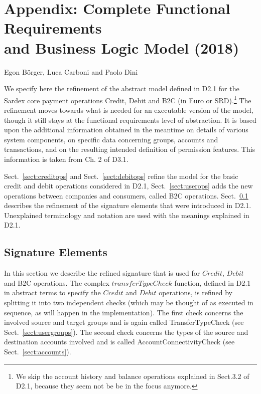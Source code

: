 \chapter*{Appendix: Complete Functional Requirements\\ and Business Logic Model (2018)}
\label{appendix}

\vspace{-1cm}
\begin{center}
Egon B\"orger, Luca Carboni and Paolo Dini
\end{center}

We specify here the refinement of the abstract model defined in D2.1 for the Sardex core payment operations Credit, Debit and B2C (in Euro or SRD).\footnote{We skip the account history and balance operations explained in Sect.3.2 of D2.1, because they seem not be be in the focus anymore.} The refinement moves towards what is needed for an executable version of the 
model, though it still stays at the functional requirements level of abstraction. It is based upon the additional information obtained in the meantime on details of various system components, on specific data concerning groups, accounts and transactions, and on the resulting intended definition of permission features. This information is taken from Ch. 2 of D3.1.

Sect.~\ref{sect:creditops} and Sect.~\ref{sect:debitops} refine the model for the basic credit and debit operations considered in D2.1,  Sect.~\ref{sect:userops} adds the new operations between companies and consumers, called B2C operations. Sect.~\ref{sect:signature} describes the refinement of the signature elements that were introduced in D2.1. Unexplained terminology and notation are used with the meanings explained in D2.1.

\section{Signature Elements}
\label{sect:signature}

In this section we describe the refined signature that is used for $Credit$, $Debit$ and B2C operations. The complex $transferTypeCheck$ function, defined in D2.1 in abstract terms to specify the $Credit$ and $Debit$ operations, is refined by splitting it into two independent checks (which may be thought of as executed in sequence, as will happen in the implementation).  The first check concerns the involved source and target groups and is again called TransferTypeCheck (see Sect.~\ref{sect:usergroups}). The second check concerns the types of the source and destination accounts involved and is called AccountConnectivityCheck (see Sect.~\ref{sect:accounts}).

